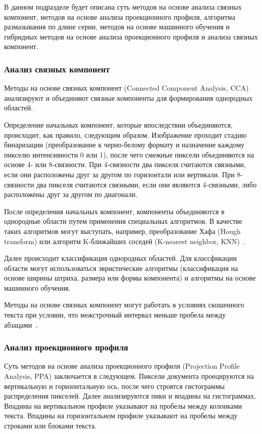 
В данном подразделе будет описана суть методов на основе анализа связных компонент, методов на основе анализа проекционного профиля, алгоритма размазывания по длине серии, методов на основе машинного обучения и гибридных методов на основе анализа проекционного профиля и анализа связных компонент.

\subsubsection{Анализ связных компонент}

Методы на основе связных компонент (Connected Component Analysis, CCA) анализируют и объединяют связные компоненты для формирования однородных областей.

Определение начальных компонент, которые впоследствии объединяются, происходит, как правило, следующим образом.
Изображение проходит стадию бинаризации (преобразование к черно-белому формату и назначение каждому пикселю интенсивности 0 или 1), после чего смежные пиксели объединяются на основе 4- или 8-связности.
При 4-связности два пикселя считаются связными, если они расположены друг за другом по горизонтали или вертикали.
При 8-связности два пикселя считаются связными, если они являются 4-связными, либо расположены друг за другом по диагонали.

После определения начальных компонент, компоненты объединяются в однородные области путем применения специальных алгоритмов.
В качестве таких алгоритмов могут выступать, например, преобразование Хафа (Hough transform) или алгоритм K-ближайших соседей (K-nearest neighbor, KNN)~\cite{dla-book}.

Далее происходит классификация однородных областей.
Для классфикации области могут использоваться эвристические алгоритмы (классификация на основе ширины штриха, размера или формы компонента) и алгоритмы на основе машинного обучения.

Методы на основе связных компонент могут работать в условиях скошенного текста при условии, что межстрочный интервал меньше пробела между абзацами~\cite{dla-book}.

\subsubsection{Анализ проекционного профиля}

Суть методов на основе анализа проекционного профиля (Projection Profile Analysis, PPA) заключается в следующем.
Пиксели документа проецируются на вертикальную и горизонтальную ось, после чего строятся гистограммы распределения пикселей.
Далее анализируются пики и впадины на гистограммах.
Впадины на вертикальном профиле указывают на пробелы между колонками текста.
Впадины на горизонтальном профиле указывают на пробелы между строками или блоками текста.

